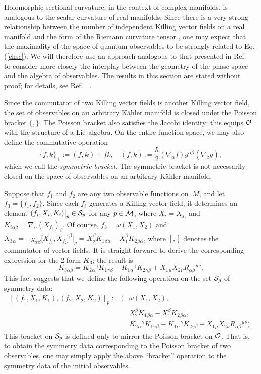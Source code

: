\documentclass[12pt,aps,eqsecnum,tighten,nofootinbib]{revtex4-2}
\def\be{\begin{equation}}
\def\ee{\end{equation}}
\def\a{\alpha}
\def\b{\beta}
\def\c{\gamma}
\def\grad{\nabla}
\def\M{{\cal M}}
\def\w{\omega}
\newcommand{\hvf}[1]{{X_{#1}}}
\begin{document}
Holomorphic sectional curvature, in the context of complex manifolds,
is analogous to the scalar curvature of real manifolds.  Since there
is a very strong relationship between the number of independent
Killing vector fields on a real manifold and the form of the Riemann
curvature tensor \cite{ashtekar}, one may expect that the maximality
of the space of quantum observables to be strongly related to
Eq. (\ref{chsc}).  We will therefore use an approach analogous to that
presented in Ref.~\cite{ashtekar} to consider more closely the
interplay between the geometry of the phase space and the algebra of
observables.  The results in this section are stated without proof;
for details, see Ref.~ \cite{thesis}.

Since the commutator of two Killing vector fields is another Killing
vector field, the set of observables on an arbitrary K\"ahler manifold
is closed under the Poisson bracket $\{,\}$.  The Poisson bracket also
satisfies the Jacobi identity; this equips ${\cal O}$ with the
structure of a Lie algebra.  On the entire function space, we may also
define the commutative operation \be \{f, k\}_+ := (f, k) + fk, \quad
(f, k) := \frac{\hbar}{2} (\grad_\a f) g^{\a\b} (\grad_\b g), \ee
which we call the {\em symmetric bracket}.  The symmetric bracket is
not necessarily closed on the space of observables on an arbitrary
K\"ahler manifold.

Suppose that $f_1$ and $f_2$ are any two observable functions on $\
M$, and let $f_3 = \{f_1, f_2 \}$.  Since each $f_i$ generates a
Killing vector field, it determines an element $(f_i, X_i, K_i)\big|_p
\in {\cal S}_p$ for any $p \in \M$, where $X_i = \hvf{f_i}$ and
$K_i{}_{\a\b} = \grad_\a(\hvf{f_i})_\b$.  Of course, $f_3 = \w(X_1,
X_2)$ and $X_3{}_\a = -g_{\a\b} \big[\hvf{f_1}, \hvf{f_2}\big]^\b
\big|_p = X_2^\b K_1{}_{\b\a} - X_1^\b K_2{}_{\b\a}$, where $[,]$
denotes the commutator of vector fields.  It is straight-forward to
derive the corresponding expression for the 2-form $K_3$; the result
is \be K_3{}_{\a\b} = K_2{}_\a{}^\c K_1{}_{\c\b} - K_1{}_\a{}^\c
K_2{}_{\c\b} + X_1{}_\mu X_2{}_\nu R_{\a\b}{}^{\mu\nu}.  \ee This fact
suggests that we define the following operation on the set ${\cal
S}_p$ of symmetry data: 
%
\be \label{pb_p}
\begin{array}{ll}
	\left[ (f_1, X_1, K_1), (f_2, X_2, K_2) \right]_p :=
	\bigg(&
		\w(X_1, X_2), \\
		&  X_2^\b K_1{}_{\b\a} - X_1^\b K_2{}_{\b\a}, \\
		&  K_2{}_\a{}^\c  K_1{}_{\c\b} -
		   K_1{}_\a{}^\c  K_2{}_{\c\b}
		   + X_1{}_\mu X_2{}_\nu R_{\a\b}{}^{\mu\nu} \bigg).
\end{array}
\ee
%
This bracket on ${\cal S}_p$ is defined only to mirror the Poisson
bracket on ${\cal O}$.  That is, to obtain the symmetry data
corresponding to the Poisson bracket of two observables, one may
simply apply the above ``bracket'' operation to the symmetry data of
the initial observables. 
\end{document}
